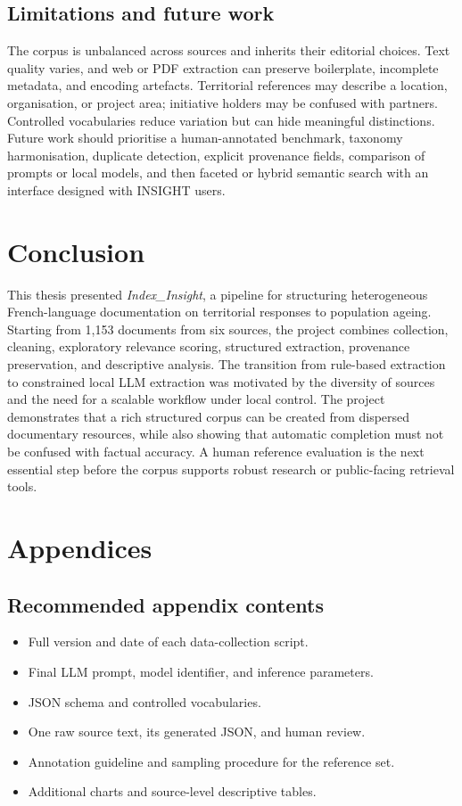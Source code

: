 \section{Limitations and future work}

The corpus is unbalanced across sources and inherits their editorial choices.
Text quality varies, and web or PDF extraction can preserve boilerplate,
incomplete metadata, and encoding artefacts. Territorial references may describe
a location, organisation, or project area; initiative holders may be confused
with partners. Controlled vocabularies reduce variation but can hide meaningful
distinctions. Future work should prioritise a human-annotated benchmark,
taxonomy harmonisation, duplicate detection, explicit provenance fields,
comparison of prompts or local models, and then faceted or hybrid semantic
search with an interface designed with INSIGHT users.

\chapter{Conclusion}

This thesis presented \textit{Index\_Insight}, a pipeline for structuring
heterogeneous French-language documentation on territorial responses to
population ageing. Starting from 1,153 documents from six sources, the project
combines collection, cleaning, exploratory relevance scoring, structured
extraction, provenance preservation, and descriptive analysis. The transition
from rule-based extraction to constrained local LLM extraction was motivated by
the diversity of sources and the need for a scalable workflow under local
control. The project demonstrates that a rich structured corpus can be created
from dispersed documentary resources, while also showing that automatic
completion must not be confused with factual accuracy. A human reference
evaluation is the next essential step before the corpus supports robust research
or public-facing retrieval tools.

\appendix
\chapter{Appendices}
\section{Recommended appendix contents}
\begin{itemize}
\item Full version and date of each data-collection script.
\item Final LLM prompt, model identifier, and inference parameters.
\item JSON schema and controlled vocabularies.
\item One raw source text, its generated JSON, and human review.
\item Annotation guideline and sampling procedure for the reference set.
\item Additional charts and source-level descriptive tables.
\end{itemize}

